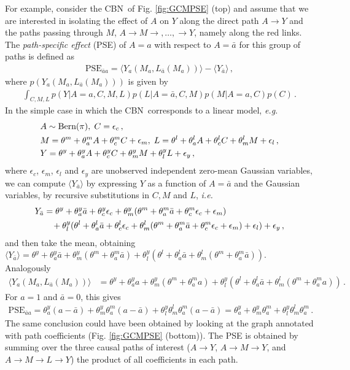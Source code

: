 \documentclass[runningheads]{llncs}
\newcommand{\figref}[1]{Fig. \ref{#1}}
\newcommand{\av}[1]{\langle #1 \rangle}
\newcommand{\ie}{\emph{i.e.}}
\newcommand{\eg}{\emph{e.g.}}
\newcommand{\CBN}{CBN}
\newcommand{\PSE}{PSE}
\begin{document}
For example, consider the \CBN~of \figref{fig:GCMPSE} (top) and assume that we are interested in isolating the effect of $A$ on $Y$ along the direct path $A\rightarrow Y$ and the paths passing through $M$, $A\rightarrow M \rightarrow,\ldots,\rightarrow Y$, namely along the red links. The \emph{path-specific effect} (\PSE) of $A=a$ with respect to $A=\bar a$ for this group of paths is defined as
\begin{align*}
\textrm{PSE}_{\bar a a} = \av{Y_a(M_a, L_{\bar a}(M_a))}-\av{Y_{\bar a}}\,,
\end{align*}
where $p(Y_a(M_a, L_{\bar a} (M_a)))$ is given by 
\begin{align*}
\int_{C,M,L} p(Y|A=a,C,M,L)p(L|A=\bar a,C,M)p(M|A=a,C)p(C)\,.
\end{align*}
In the simple case in which the \CBN~corresponds to a linear model, \eg
\begin{align}
&A\sim\textrm{Bern}(\pi), \hskip0.1cm C = \epsilon_c\,,\nonumber\\
&M=\theta^m+\theta^m_{a}A+\theta^m_{c}C+\epsilon_m,\hskip0.1cm L=\theta^l+\theta^l_{a}A+\theta^l_{c}C+\theta^l_{m}M+\epsilon_l\,,\nonumber\\
&Y=\theta^y+\theta^y_{a}A+\theta^y_{c}C+\theta^y_{m}M+\theta^y_{l}L+\epsilon_y\,,\label{eq:lm}
\end{align}
where $\epsilon_c$, $\epsilon_m$, $\epsilon_l$ and $\epsilon_y$ are unobserved independent zero-mean Gaussian variables, 
we can compute $\av{Y_{\bar a}}$ by expressing $Y$ as a function of $A=\bar a$ and the Gaussian variables, by recursive substitutions in $C, M$ and $L$, \ie~
\begin{align*}
Y_{\bar a}&=\theta^y+\theta^y_{a}\bar a+\theta^y_{c}\epsilon_c+\theta^y_{m}(\theta^m+\theta^m_{a}\bar a+\theta^m_{c}\epsilon_c+\epsilon_m)\\
&\hskip0.32cm+\theta^y_{l}(\theta^l+\theta^l_{a}\bar a+\theta^l_{c}\epsilon_c+\theta^l_{m}(\theta^m+\theta^m_{a}\bar a+\theta^m_{c}\epsilon_c+\epsilon_m)+\epsilon_l)+\epsilon_y\,,
\end{align*}
and then take the mean, obtaining $\av{Y_{\bar a}}=\theta^y+\theta^y_{a}\bar a+\theta^y_{m}(\theta^m+\theta^m_{a}\bar a)+\theta^y_{l}(\theta^l+\theta^l_{a}\bar a+\theta^l_{m}(\theta^m+\theta^m_{a}\bar a))$. Analogously
\begin{align*}
\av{Y_a(M_a, L_{\bar a}(M_a))}&=\theta^y+\theta^y_{a}a+\theta^y_m(\theta^m+\theta^m_{a}a)+\theta^y_l(\theta^l+\theta^l_a\bar a+ \theta^l_m(\theta^m+\theta^m_{a}a))\,.
\end{align*}
For $a=1$ and $\bar a = 0$, this gives
\begin{align*}
\textrm{PSE}_{\bar a a}=\theta^y_{a}(a-\bar a)+\theta^y_{m}\theta^m_{a}(a-\bar a)+\theta^y_{l}\theta^l_{m}\theta^m_{a}(a-\bar a)=\theta^y_{a}+\theta^y_{m}\theta^m_{a}+\theta^y_{l}\theta^l_{m}\theta^m_{a}\,.
\end{align*}
The same conclusion could have been obtained by looking at the graph annotated with path coefficients (\figref{fig:GCMPSE} (bottom)). The PSE is obtained by summing over the three causal paths of interest ($A\rightarrow Y$, $A\rightarrow M \rightarrow Y$, and $A\rightarrow M \rightarrow L \rightarrow Y$) the product of all coefficients in each path.
\end{document}
